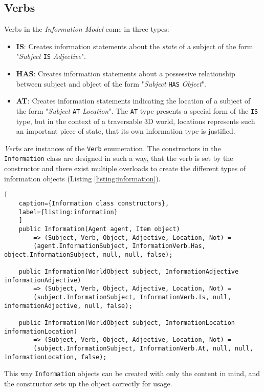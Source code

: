 \subsection{Verbs}
Verbs in the \textit{Information Model} come in three types:
\begin{itemize}
	\item \textbf{IS}: Creates information statements about the \textit{state} of a subject of the form "\textit{Subject} \verb|IS| \textit{Adjective}".
	\item \textbf{HAS}: Creates information statements about a possessive relationship between subject and object of the form "\textit{Subject} \verb|HAS| \textit{Object}".
	\item \textbf{AT}: Creates information statements indicating the location of a subject of the form "\textit{Subject} \verb|AT| \textit{Location}". The \verb|AT| type presents a special form of the \verb|IS| type, but in the context of a traversable 3D world, locations represents such an important piece of state, that its own information type is justified.
\end{itemize}
\textit{Verbs} are instances of the \verb|Verb| enumeration. The constructors in the \verb|Information| class are designed in such a way, that the verb is set by the constructor and there exist multiple overloads to create the different types of information objects (Listing \ref{listing:information}).
\begin{lstlisting}[
	caption={Information class constructors},
	label={listing:information}
	]
	public Information(Agent agent, Item object)
		=> (Subject, Verb, Object, Adjective, Location, Not) =
		(agent.InformationSubject, InformationVerb.Has, object.InformationSubject, null, null, false);
	
	public Information(WorldObject subject, InformationAdjective informationAdjective)
		=> (Subject, Verb, Object, Adjective, Location, Not) =
		(subject.InformationSubject, InformationVerb.Is, null, informationAdjective, null, false);
	
	public Information(WorldObject subject, InformationLocation informationLocation)
		=> (Subject, Verb, Object, Adjective, Location, Not) =
		(subject.InformationSubject, InformationVerb.At, null, null, informationLocation, false);
\end{lstlisting}
This way \verb|Information| objects can be created with only the content in mind, and the constructor sets up the object correctly for usage.
